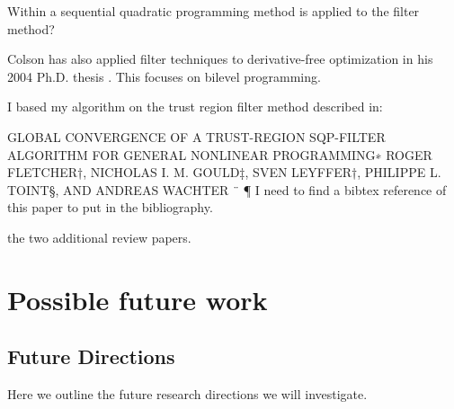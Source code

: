 \documentclass{article}
\begin{document}
Within \cite{DUMMY:sqp_filter} a sequential quadratic programming method is applied to the filter method?


Colson has also applied filter techniques to derivative-free optimization in his 2004 Ph.D. thesis \cite{Colson2004}.
This focuses on bilevel programming.


I based my algorithm on the trust region filter method described in:

GLOBAL CONVERGENCE OF A TRUST-REGION SQP-FILTER
ALGORITHM FOR GENERAL NONLINEAR PROGRAMMING∗
ROGER FLETCHER†, NICHOLAS I. M. GOULD‡, SVEN LEYFFER†,
PHILIPPE L. TOINT§, AND ANDREAS WACHTER ¨ ¶
I need to find a bibtex reference of this paper to put in the bibliography.




the two additional review papers.



\section{Possible future work}

\subsection{Future Directions}

Here we outline the future research directions we will investigate.


\end{document}
